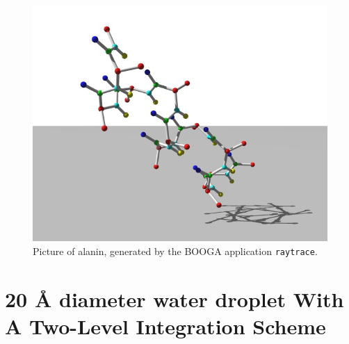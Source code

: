 \documentclass[11pt]{report}
\providecommand{\ttsmall}[1]{\texttt{\small\mbox{#1}}}
\begin{document}
\clearpage
\begin{figure}[htb]
   \centerline{\includegraphics[width=12cm]{alanin_66.jpg}}
    \caption{Picture of alanin, generated by the BOOGA application \ttsmall{raytrace}.  \label{fig:alanin}}
\end{figure}




\section{20 \AA{ }diameter water droplet With A Two-Level Integration
  Scheme}
\end{document}
